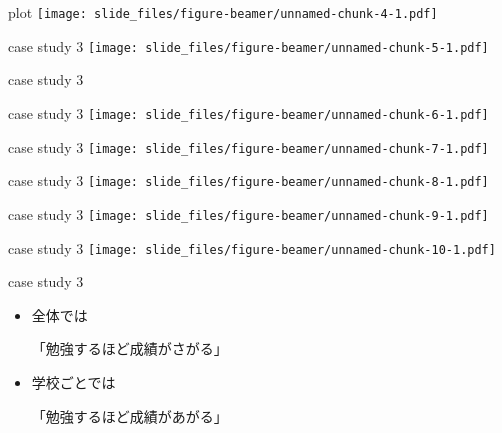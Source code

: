 \documentclass[
  ignorenonframetext,
]{beamer}
\begin{document}
\begin{frame}{plot}
\protect\hypertarget{plot}{}
\texttt{[image: slide\_files/figure-beamer/unnamed-chunk-4-1.pdf]}
\end{frame}

\begin{frame}{case study 3}
\protect\hypertarget{case-study-3-2}{}
\texttt{[image: slide\_files/figure-beamer/unnamed-chunk-5-1.pdf]}
\end{frame}

\begin{frame}{case study 3}
\protect\hypertarget{case-study-3-3}{}
\end{frame}

\begin{frame}{case study 3}
\protect\hypertarget{case-study-3-4}{}
\texttt{[image: slide\_files/figure-beamer/unnamed-chunk-6-1.pdf]}
\end{frame}

\begin{frame}{case study 3}
\protect\hypertarget{case-study-3-5}{}
\texttt{[image: slide\_files/figure-beamer/unnamed-chunk-7-1.pdf]}
\end{frame}

\begin{frame}{case study 3}
\protect\hypertarget{case-study-3-6}{}
\texttt{[image: slide\_files/figure-beamer/unnamed-chunk-8-1.pdf]}
\end{frame}

\begin{frame}{case study 3}
\protect\hypertarget{case-study-3-7}{}
\texttt{[image: slide\_files/figure-beamer/unnamed-chunk-9-1.pdf]}
\end{frame}

\begin{frame}{case study 3}
\protect\hypertarget{case-study-3-8}{}
\texttt{[image: slide\_files/figure-beamer/unnamed-chunk-10-1.pdf]}
\end{frame}

\begin{frame}{case study 3}
\protect\hypertarget{case-study-3-9}{}
\LARGE

\begin{itemize}
\item[\textbullet] 全体では\par
「勉強するほど成績がさがる」
\bigskip\pause
\item[\textbullet] 学校ごとでは\par
「勉強するほど成績があがる」
\end{itemize}
\end{frame}
\end{document}
